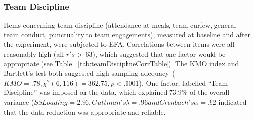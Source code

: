 \begin{CJK}{UTF8}{gbsn}
%  


%  


\subsubsection{Team Discipline\label{app9:teamDisciplineEFA}}
Items concerning team discipline (attendance at meals, team curfew, general team conduct, punctuality to team engagements), measured at baseline and after the experiment, were subjected to EFA.  Correlations between items were all reasonably high (all $r's > .63$), which suggested that one factor would be appropriate (see Table ~\ref{tab:teamDisciplineCorrTable}).
The KMO index and Bartlett's test both suggested high sampling adequacy, ($KMO = .78, \chi^2(6, 116) = 362.75, p < .0001$).  One factor, labelled ``Team Discipline'' was imposed on the data, which explained 73.9\% of the overall variance
($ SS Loading = 2.96, Guttman's \lambda = .96 and Cronbach's \alpha = .92$ indicated that the data reduction was appropriate and reliable.





\end{CJK}
